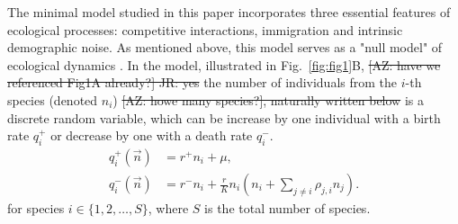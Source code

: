 \documentclass[9pt,twocolumn,twoside,lineno]{pnas-new}
\begin{document}


The minimal model studied in this paper incorporates three essential features of ecological processes: competitive interactions, immigration and intrinsic demographic noise. As mentioned above, %
this model serves as a "null model" of  ecological dynamics \cite{black2012stochastic}.
In the model, illustrated  in Fig.~\ref{fig:fig1}B, \st{[AZ: have we referenced Fig1A already?] JR: yes} the number of individuals from the $i$-th species (denoted $n_i$) \st{[AZ: howe many species?], naturally written below} is a discrete random variable, which can be increase by one individual with a birth rate $q^+_i$  or decrease by one with a death rate $q^-_i$. %
\begin{align}
q_i^+(\vec{n})&=r^+ n_i +\mu,  \\
q_i^-(\vec{n})&=r^- n_i + \frac{r}{K} n_i \left(n_i +\sum_{j\neq i} \rho _{j,i} n_j\right). \nonumber
\end{align}
for species $i\in \{1,2,\dots,S\}$, where $S$ is the total number of species.
\end{document}

